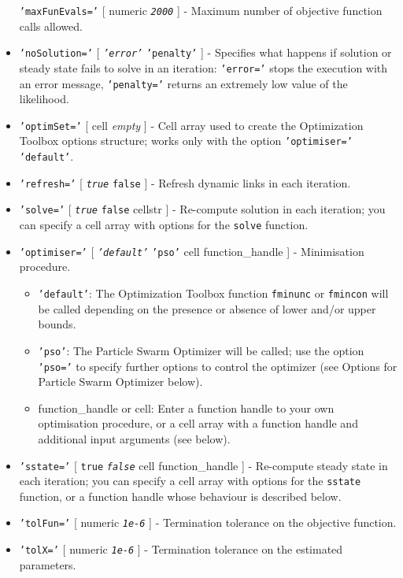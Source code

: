 \begin{itemize}
   \texttt{'maxFunEvals='} {[} numeric \textbar{} \emph{\texttt{2000}}
   {]} - Maximum number of objective function calls allowed.
 \item
   \texttt{'noSolution='} {[} \emph{\texttt{'error'}} \textbar{}
   \texttt{'penalty'} {]} - Specifies what happens if solution or steady
   state fails to solve in an iteration: \texttt{'error='} stops the
   execution with an error message, \texttt{'penalty='} returns an
   extremely low value of the likelihood.
 \item
   \texttt{'optimSet='} {[} cell \textbar{} \emph{empty} {]} - Cell array
   used to create the Optimization Toolbox options structure; works only
   with the option \texttt{'optimiser='} \texttt{'default'}.
 \item
   \texttt{'refresh='} {[} \emph{\texttt{true}} \textbar{} \texttt{false}
   {]} - Refresh dynamic links in each iteration.
 \item
   \texttt{'solve='} {[} \emph{\texttt{true}} \textbar{} \texttt{false}
   \textbar{} cellstr {]} - Re-compute solution in each iteration; you
   can specify a cell array with options for the \texttt{solve} function.
 \item
   \texttt{'optimiser='} {[} \emph{\texttt{'default'}} \textbar{}
   \texttt{'pso'} \textbar{} cell \textbar{} function\_handle {]} -
   Minimisation procedure.
 
   \begin{itemize}
   \item
     \texttt{'default'}: The Optimization Toolbox function
     \texttt{fminunc} or \texttt{fmincon} will be called depending on the
     presence or absence of lower and/or upper bounds.
   \item
     \texttt{'pso'}: The Particle Swarm Optimizer will be called; use the
     option \texttt{'pso='} to specify further options to control the
     optimizer (see Options for Particle Swarm Optimizer below).
   \item
     function\_handle or cell: Enter a function handle to your own
     optimisation procedure, or a cell array with a function handle and
     additional input arguments (see below).
   \end{itemize}
 \item
   \texttt{'sstate='} {[} \texttt{true} \textbar{} \emph{\texttt{false}}
   \textbar{} cell \textbar{} function\_handle {]} - Re-compute steady
   state in each iteration; you can specify a cell array with options for
   the \texttt{sstate} function, or a function handle whose behaviour is
   described below.
 \item
   \texttt{'tolFun='} {[} numeric \textbar{} \emph{\texttt{1e-6}} {]} -
   Termination tolerance on the objective function.
 \item
   \texttt{'tolX='} {[} numeric \textbar{} \emph{\texttt{1e-6}} {]} -
   Termination tolerance on the estimated parameters.
 \end{itemize}
 
